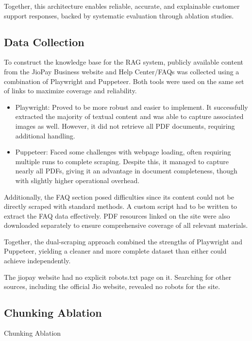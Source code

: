 Together, this architecture enables reliable, accurate, and explainable customer support responses, backed by systematic evaluation through ablation studies.

\subsection{Data Collection}
To construct the knowledge base for the RAG system, publicly available content from the JioPay Business website and Help Center/FAQs was collected using a combination of Playwright and Puppeteer. Both tools were used on the same set of links to maximize coverage and reliability.

\begin{itemize}
	\item Playwright: Proved to be more robust and easier to implement. It successfully extracted the majority of textual content and was able to capture associated images as well. However, it did not retrieve all PDF documents, requiring additional handling.
	\item 	Puppeteer: Faced some challenges with webpage loading, often requiring multiple runs to complete scraping. Despite this, it managed to capture nearly all PDFs, giving it an advantage in document completeness, though with slightly higher operational overhead.
\end{itemize}


Additionally, the FAQ section posed difficulties since its content could not be directly scraped with standard methods. A custom script had to be written to extract the FAQ data effectively. PDF resources linked on the site were also downloaded separately to ensure comprehensive coverage of all relevant materials.

Together, the dual-scraping approach combined the strengths of Playwright and Puppeteer, yielding a cleaner and more complete dataset than either could achieve independently.

The jiopay website had no explicit robots.txt page on it. Searching for other sources, including the official Jio website, revealed no robots for the site. 

\subsection{Chunking Ablation}
Chunking Ablation

